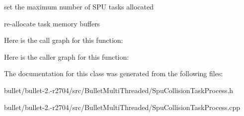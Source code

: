 set the maximum number of S\+P\+U tasks allocated 

re-\/allocate task memory buffers 

Here is the call graph for this function\+:




Here is the caller graph for this function\+:




The documentation for this class was generated from the following files\+:\begin{DoxyCompactItemize}
\item 
bullet/bullet-\/2.-\/r2704/src/\+Bullet\+Multi\+Threaded/Spu\+Collision\+Task\+Process.\+h\item 
bullet/bullet-\/2.-\/r2704/src/\+Bullet\+Multi\+Threaded/Spu\+Collision\+Task\+Process.\+cpp\end{DoxyCompactItemize}
